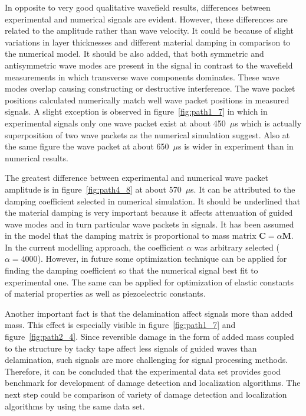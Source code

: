 \documentclass[12pt]{iopart}
\newcommand{\bm}[1]{\mathbf{#1}}
\begin{document}
In opposite to very good qualitative wavefield results, differences between experimental and numerical signals are evident. However, these differences are related to the amplitude rather than wave velocity. It could be because of slight variations in layer thicknesses and different material damping in comparison to the numerical model. It should be also added, that both symmetric and antisymmetric wave modes are present in the signal in contrast to the wavefield measurements in which transverse wave components dominates. These wave modes overlap causing constructing or destructive interference. The wave packet positions calculated numerically match well wave packet positions in measured signals. A slight exception is observed in figure~\ref{fig:path1_7} in which in experimental signals only one wave packet exist at about 450~$\mu$s which is actually superposition of two wave packets as the numerical simulation suggest. Also at the same figure the wave packet at about 650~$\mu$s is wider in experiment than in numerical results. 

The greatest difference between experimental and numerical wave packet amplitude is in figure~\ref{fig:path4_8} at about 570~$\mu$s. It can be attributed to the damping coefficient selected in numerical simulation. It should be underlined that the material damping is very important because it affects attenuation of guided wave modes and in turn particular wave packets in signals. It has been assumed in the model that the damping matrix is proportional to mass matrix $\bm{C} = \alpha \bm{M}$. In the current modelling approach, the coefficient $\alpha$ was arbitrary selected ($\alpha = 4000$). However, in future some optimization technique can be applied for finding the damping coefficient so that the numerical signal best fit to experimental one. The same can be applied for optimization of elastic constants of material properties as well as piezoelectric constants. 

Another important fact is that the delamination affect signals more than added mass. This effect is especially visible in figure~\ref{fig:path1_7} and figure~\ref{fig:path2_4}. Since reversible damage in the form of added mass coupled to the structure by tacky tape affect less signals of guided waves than delamination, such signals are more challenging for signal processing methods. Therefore, it can be concluded that the experimental data set provides good benchmark for development of damage detection and localization algorithms. The next step could be comparison of variety of damage detection and localization algorithms by using the same data set.
\end{document}
